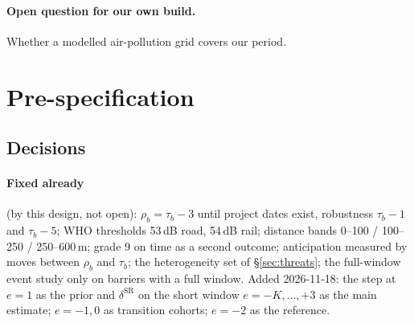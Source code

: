 \documentclass[11pt]{article}
\begin{document}
\paragraph{Open question for our own build.} Whether a modelled air-pollution grid covers our
period.

\section{Pre-specification}\label{sec:prespec}

\subsection{Decisions}\label{sec:decisions}

\paragraph{Fixed already} (by this design, not open): \(\rho_b = \tau_b - 3\) until project dates
exist, robustness \(\tau_b - 1\) and \(\tau_b - 5\); WHO thresholds 53\,dB road, 54\,dB rail;
distance bands 0--100 / 100--250 / 250--600\,m; grade 9 on time as a second outcome;
anticipation measured by moves between \(\rho_b\) and \(\tau_b\); the heterogeneity set of
\S\ref{sec:threats}; the full-window event study only on barriers with a full window. Added 2026-11-18: the step at
\(e = 1\) as the prior and \(\delta^{\text{SR}}\) on the short window \(e = -K, \dots, +3\) as the
main estimate; \(e = -1, 0\) as transition cohorts; \(e = -2\) as the reference.
\end{document}
